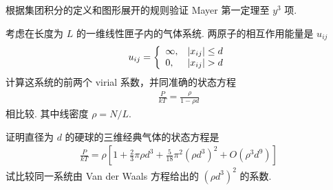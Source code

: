 \documentclass{assignment}
\begin{document}
\begin{prob}
    根据集团积分的定义和图形展开的规则验证 Mayer 第一定理至 $y^3$ 项.
\end{prob}
\begin{pf}
    
\end{pf}

\begin{prob}
    考虑在长度为 $L$ 的一维线性匣子内的气体系统. 两原子的相互作用能量是 $u_{ij}$
    \begin{align}
        u_{ij}=\left\{\begin{array}{ll}
            \infty,&\left\lvert x_{ij}\right\rvert\leq d\\
            0,&\left\lvert x_{ij}\right\rvert>d
        \end{array}\right.
    \end{align}
    计算这系统的前两个 virial 系数，并同准确的状态方程
    \begin{align}
        \frac{P}{kT}=\frac{\rho}{1-\rho d}
    \end{align}
    相比较. 其中线密度 $\rho=N/L$.
\end{prob}
\begin{sol}
    
\end{sol}

\begin{prob}
    证明直径为 $d$ 的硬球的三维经典气体的状态方程是
    \begin{align}
        \frac{P}{kT}=\rho\left[1+\frac{2}{3}\pi\rho d^3+\frac{5}{18}\pi^2(\rho d^3)^2+O(\rho^3d^9)\right]
    \end{align}
    试比较同一系统由 Van der Waals 方程给出的 $(\rho d^3)^2$ 的系数.
\end{prob}
\begin{pf}

\end{pf}
\end{document}
